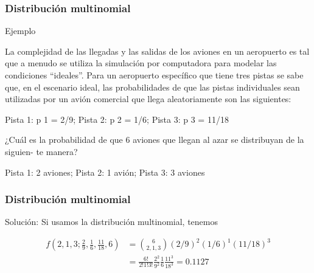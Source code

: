 \documentclass[spanish]{beamer}
\begin{document}
\begin{frame}
\frametitle{Distribución multinomial}  
Ejemplo

La complejidad de las llegadas y las salidas de los aviones en un aeropuerto es tal que a
menudo se utiliza la simulación por computadora para modelar las condiciones “ideales”. Para un aeropuerto específico que tiene tres pistas se sabe que, en el escenario ideal,
las probabilidades de que las pistas individuales sean utilizadas por un avión comercial
que llega aleatoriamente son las siguientes:
\begin{center}
Pista 1: p 1 = 2/9;
Pista 2: p 2 = 1/6;
Pista 3: p 3 = 11/18
\end{center}
¿Cuál es la probabilidad de que 6 aviones que llegan al azar se distribuyan de la siguien-
te manera?
\begin{center}
Pista 1: 2 aviones;
Pista 2: 1 avión;
Pista 3: 3 aviones
\end{center}
\end{frame}
\begin{frame}
\frametitle{Distribución multinomial}  
Solución: Si usamos la distribución multinomial, tenemos

\begin{equation*} \label{eq2}
\begin{split}
f(2,1,3; \frac{2}{9}, \frac{1}{6},\frac{11}{18}, 6) & = \binom{6}{2, 1, 3} (2/9)^{2} (1/6)^{1} (11/18)^{3} \\
 & = \frac{6!}{2!1!3!} \frac{2^2}{9^2} \frac{1}{6}\frac{11^3}{18^3}=0.1127
\end{split}
\end{equation*}

\end{frame}
\end{document}
